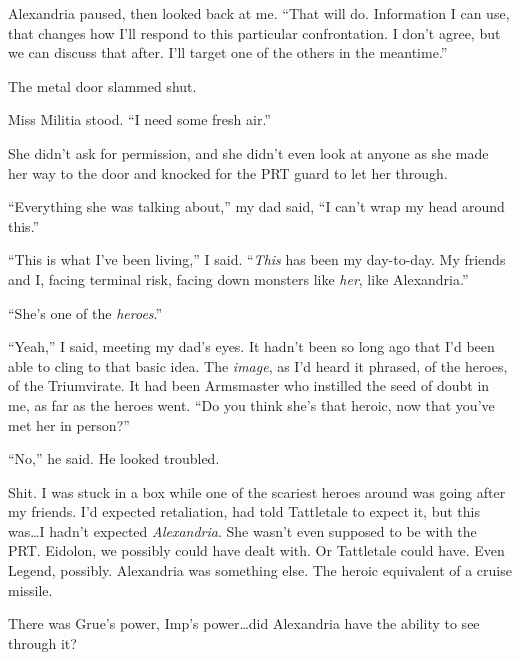 Alexandria paused, then looked back at me.  ``That will do.  Information I can use, that changes how I'll respond to this particular confrontation.  I don't agree, but we can discuss that after.  I'll target one of the others in the meantime.''



The metal door slammed shut.



Miss Militia stood.  ``I need some fresh air.''



She didn't ask for permission, and she didn't even look at anyone as she made her way to the door and knocked for the PRT guard to let her through.



``Everything she was talking about,'' my dad said, ``I can't wrap my head around this.''



``This is what I've been living,'' I said.  ``\emph{This }has been my day-to-day.  My friends and I, facing terminal risk, facing down monsters like \emph{her}, like Alexandria.''



``She's one of the \emph{heroes}.''



``Yeah,'' I said, meeting my dad's eyes.  It hadn't been so long ago that I'd been able to cling to that basic idea.  The \emph{image}, as I'd heard it phrased, of the heroes, of the Triumvirate.  It had been Armsmaster who instilled the seed of doubt in me, as far as the heroes went.  ``Do you think she's that heroic, now that you've met her in person?''



``No,'' he said.  He looked troubled.



Shit.  I was stuck in a box while one of the scariest heroes around was going after my friends.  I'd expected retaliation, had told Tattletale to expect it, but this was\ldots I hadn't expected \emph{Alexandria}.  She wasn't even supposed to be with the PRT.  Eidolon, we possibly could have dealt with.  Or Tattletale could have.  Even Legend, possibly.  Alexandria was something else.  The heroic equivalent of a cruise missile.



There was Grue's power, Imp's power\ldots did Alexandria have the ability to see through it?



